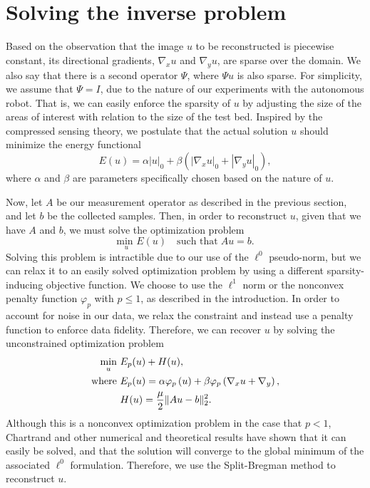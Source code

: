 \documentclass[english]{article}\usepackage[]{graphicx}\usepackage[]{color}
\begin{document}

\section{Solving the inverse problem}

Based on the observation that the image $u$ to be reconstructed is
piecewise constant, its directional gradients, $\nabla_x u$ and $\nabla_y u$, are sparse over
the domain. We also say that there is a second operator $\Psi$, where $\Psi u$
is also sparse. For simplicity, we assume that $\Psi = I$, due to the nature 
of our experiments with the autonomous robot. That is, we can easily 
enforce the sparsity of $u$ by adjusting the size of the areas of interest with 
relation to the size of the test bed. Inspired by the compressed sensing theory, we postulate
that the actual solution $u$ should minimize the energy functional 
\[E(u) = \alpha |u|_0 + \beta\left(|\nabla_x u|_0+|\nabla_y u|_0\right),\]
where $\alpha$ and $\beta$ are parameters specifically chosen based on the nature
of $u$.

Now, let $A$ be our measurement operator as described in the previous section, and let 
$b$ be the collected samples. Then, in order to reconstruct $u$, given that we have $A$ and $b$, we must solve the optimization problem
\[ \underset{u}{{\text{{min }}}} E(u)\quad\text{such that}\; Au=b.\]
Solving this problem is intractible due to our use of the $\ell^0$ pseudo-norm, but we 
can relax it to an easily solved optimization problem by using a different sparsity-inducing 
objective function. We choose to use the $\ell^1$ norm or the nonconvex penalty function
$\varphi_p$ with $p \leq 1$, as described in the introduction. In order to account for noise 
in our data, we relax the constraint and instead use a penalty function to enforce data 
fidelity. Therefore, we can recover $u$ by solving the unconstrained optimization problem 
\begin{align}
\underset{u}{\text{min}}\text{\ }&E_{p}(u)+H(u),\label{eq:minprob}\\
\text{where }&E_{p}(u)=\alpha\varphi_p\left(u\right)+\beta\varphi_p\left(\nabla_x u + \nabla_y\right),\notag\\
&H(u)=\frac{\mu}{2}\|Au-b\|_2^2.\notag
\end{align}
Although this is a nonconvex optimization problem in the case that $p<1$,
Chartrand \cite{chartrand2009fast} and other numerical and theoretical results have shown that it can easily be solved, 
and that the solution will converge to the global minimum of the 
associated $\ell^0$ formulation. Therefore, we use the Split-Bregman method to reconstruct $u$. 
\end{document}
